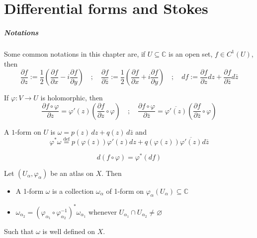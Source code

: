 \chapter{Differential forms and Stokes}\label{chp:difforms}

\paragraph{Notations} Some common notations in this chapter are, if \(U
\subseteq \mathbb{C} \) is an open set, \(f \in C^{1}{(U)}\), then
\[
  \frac{\partial f}{\partial z} := \frac{1}{2}{\left( \frac{\partial f}{\partial
  x} - i \frac{\partial f}{\partial y} \right)} \quad ; \quad \frac{\partial
f}{\partial \bar{z}} := \frac{1}{2} {\left( \frac{\partial f}{\partial x} +
i \frac{\partial f}{\partial y}\right)} \quad ; \quad df := \frac{\partial f}{\partial z} dz + \frac{\partial f}{\partial
\bar{z}} d\bar{z}\] 

If \(\varphi : V \to U\) is holomorphic, then
\[
  \frac{\partial f \circ \varphi}{\partial z} = \varphi'{(z)} {\left( \frac{\partial
  f}{\partial z} \circ \varphi \right)}  \quad ; \quad \frac{\partial f \circ
\varphi}{\partial \bar{z}} = \overline{\varphi'{(z)}} {\left( \frac{\partial
f}{\partial \bar{z}} \circ \varphi \right)} 
\]
\begin{definition}{}
    A \(1\)-form on \(U\) is \(\omega = p{(z)} \,dz + q {(z)}
    \,d\bar{z}\) and
    \[
      \varphi^{*} \omega \overset{\text{def}}{=} p{(\varphi {(z)})} \varphi'{(z)} dz +
      q{(\varphi{(z)})} \overline{\varphi'{(z)}} d\bar{z}
    \]
\end{definition}

\begin{remark}{}
    \[
      d{(f \circ \varphi)} = \varphi^{*}{(df)}
    \]
\end{remark}
\begin{definition}{}
    Let \({(U_{\alpha} , \varphi _{\alpha} )}\) be an atlas on \(X\). Then
\begin{itemize}[label = \bullet]
    \item A 1-form \(\omega\) is a collection \(\omega_{\alpha} \) of 1-form on
        \(\varphi _{\alpha} {(U_{\alpha} )} \subseteq \mathbb{C} \) 
    \item \(\omega_{\alpha_{2}} = {\left( \varphi _{\alpha_{1}} \circ \varphi
        _{\alpha_{2}}^{-1} \right)}^{*} \omega_{\alpha_{1}}  \) whenever
        \(U_{\alpha_{1}} \cap U_{\alpha_{2}} \neq \varnothing\) 
\end{itemize}
    Such that \(\omega\) is well defined on \(X\).

\end{definition}


